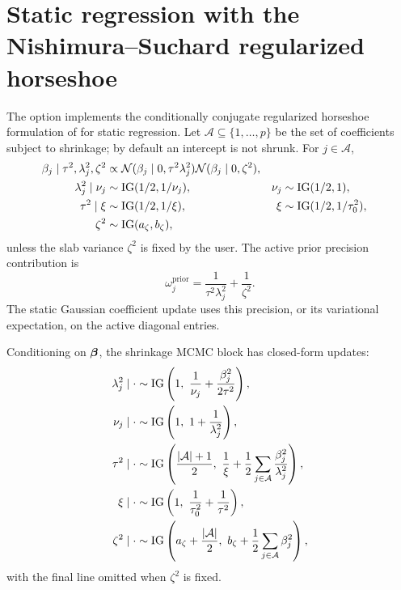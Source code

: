\section{Static regression with the Nishimura--Suchard regularized horseshoe}
\label{sec:static_rhs}

The  option implements the conditionally conjugate
regularized horseshoe formulation of \citet{nishimura2023shrunken} for
static regression. Let $\mathcal{A}\subseteq\{1,\ldots,p\}$ be the set of
coefficients subject to shrinkage; by default an intercept is not shrunk. For
$j\in\mathcal{A}$,
\begin{align}
\beta_j\mid\tau^2,\lambda_j^2,\zeta^2
&\propto
\mathcal{N}(\beta_j\mid0,\tau^2\lambda_j^2)
\mathcal{N}(\beta_j\mid0,\zeta^2),\\
\lambda_j^2\mid\nu_j &\sim \operatorname{IG}(1/2,1/\nu_j),&
\nu_j&\sim\operatorname{IG}(1/2,1),\\
\tau^2\mid\xi &\sim\operatorname{IG}(1/2,1/\xi),&
\xi&\sim\operatorname{IG}(1/2,1/\tau_0^2),\\
\zeta^2&\sim\operatorname{IG}(a_\zeta,b_\zeta),
\label{eq:rhs_ns_hierarchy}
\end{align}
unless the slab variance $\zeta^2$ is fixed by the user. The active prior
precision contribution is
\begin{equation}
\omega^{\mathrm{prior}}_j
=\frac{1}{\tau^2\lambda_j^2}+\frac{1}{\zeta^2}.
\label{eq:rhs_ns_precision}
\end{equation}
The static Gaussian coefficient update uses this precision, or its
variational expectation, on the active diagonal entries.

Conditioning on $\boldsymbol{\beta}$, the shrinkage MCMC block has closed-form
updates:
\begin{align}
\lambda_j^2\mid\cdot
&\sim
\operatorname{IG}\left(1,\ \frac{1}{\nu_j}+\frac{\beta_j^2}{2\tau^2}\right),\\
\nu_j\mid\cdot
&\sim
\operatorname{IG}\left(1,\ 1+\frac{1}{\lambda_j^2}\right),\\
\tau^2\mid\cdot
&\sim
\operatorname{IG}\left(\frac{|\mathcal{A}|+1}{2},\
\frac{1}{\xi}
+\frac{1}{2}\sum_{j\in\mathcal{A}}\frac{\beta_j^2}{\lambda_j^2}
\right),\\
\xi\mid\cdot
&\sim
\operatorname{IG}\left(1,\ \frac{1}{\tau_0^2}+\frac{1}{\tau^2}\right),\\
\zeta^2\mid\cdot
&\sim
\operatorname{IG}\left(a_\zeta+\frac{|\mathcal{A}|}{2},\
b_\zeta+\frac{1}{2}\sum_{j\in\mathcal{A}}\beta_j^2
\right),
\label{eq:rhs_ns_mcmc}
\end{align}
with the final line omitted when $\zeta^2$ is fixed.

